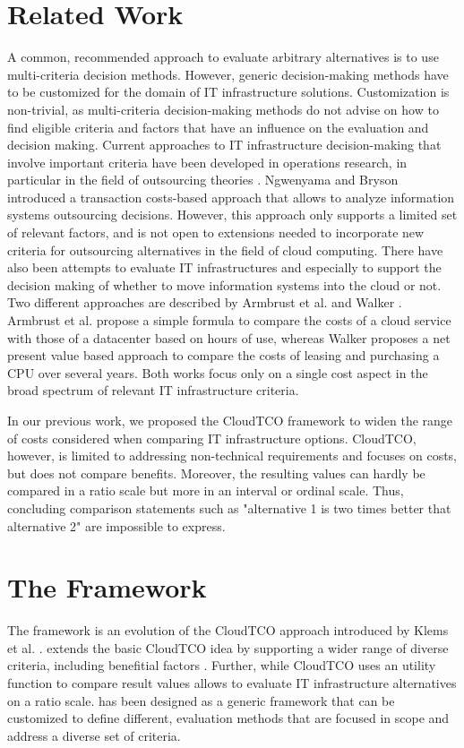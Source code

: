 \documentclass[journal,final,a4paper,twoside]{IEEEtran}
\begin{document}
\section{Related Work}
\label{relatedWork}
A common, recommended approach to evaluate arbitrary alternatives is to use multi-criteria decision methods. However, generic decision-making methods have to be customized for the domain of IT infrastructure solutions. Customization is non-trivial, as multi-criteria decision-making methods do not advise on how to find eligible criteria and factors that have an influence on the evaluation and decision making.
Current approaches to IT infrastructure decision-making that involve important criteria have been developed in operations research, in particular in the field of outsourcing theories \cite{lacity1993information}. Ngwenyama and Bryson \cite{ngwenyama1999making} introduced a transaction costs-based approach that allows to analyze information systems outsourcing decisions. However, this approach only supports a limited set of relevant factors, and is not open to extensions needed  to incorporate new criteria for outsourcing alternatives in the field of cloud computing. There have also been attempts to evaluate IT infrastructures and especially to support the decision making of whether to move information systems into the cloud or not. Two different approaches are described by Armbrust et al. \cite{armbrust2009above} and Walker \cite{10.1109/MC.2009.135}. Armbrust et al. propose a simple formula to compare the costs of a cloud service with those of a datacenter based on hours of use, whereas Walker proposes a net present value based approach to compare the costs of leasing and purchasing a CPU over several years. Both works focus only on a single cost aspect in the broad spectrum of relevant IT infrastructure criteria.

In our previous work, we proposed the CloudTCO framework \cite{klems2008dccaffetvocc} to widen the range of costs considered when comparing IT infrastructure options. CloudTCO, however, is limited to addressing non-technical requirements and focuses on costs, but does not compare benefits. Moreover, the resulting values can hardly be compared in a ratio scale but more in an interval or ordinal scale. Thus, concluding comparison statements such as "alternative 1 is two times better that alternative 2" are impossible to express.





\section{The  Framework}
\label{mc22framework}
The  framework is an evolution of the CloudTCO approach introduced by Klems et al. \cite{klems2008dccaffetvocc}.  extends the basic CloudTCO idea by supporting a wider range of diverse criteria, including benefitial factors . Further, while CloudTCO uses an utility function to compare result values  allows to evaluate IT infrastructure alternatives on a ratio scale.  has been designed as a generic framework that can be customized to define different, evaluation methods that are focused in scope and address a diverse set of criteria.
\end{document}
